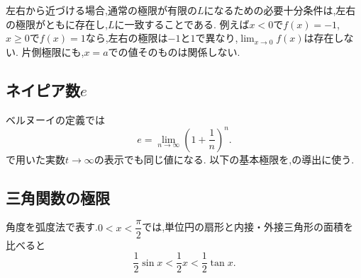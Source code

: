     左右から近づける場合,通常の極限が有限の$L$になるための必要十分条件は,左右の極限がともに存在し,$L$に一致することである.
    例えば$x<0$で$f(x)=-1$,$x\ge0$で$f(x)=1$なら,左右の極限は$-1$と$1$で異なり,$\lim_{x\to0}f(x)$は存在しない.
    片側極限にも,$x=a$での値そのものは関係しない.

  \subsection{\texorpdfstring{ネイピア数$e$}{ネイピア数e}}\label{節：ネイピア数eの定義}
    ベルヌーイの定義では
    \[
      e=\lim_{n\to\infty}\left(1+\frac1n\right)^n.
    \]
    で用いた実数$t\to\infty$の表示でも同じ値になる.
    以下の基本極限を,の導出に使う.

  \subsection{三角関数の極限}\label{節：三角関数の基本極限}
    角度を弧度法で表す.$0<x<\dfrac{\pi}{2}$では,単位円の扇形と内接・外接三角形の面積を比べると
    \[
      \frac12\sin x<\frac12x<\frac12\tan x.
    \]
